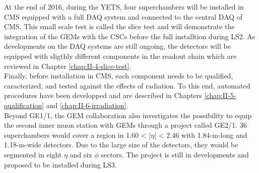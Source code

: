     At the end of 2016, during the YETS, four superchambers will be installed in CMS equipped with a full DAQ system and connected to the central DAQ of CMS. This small scale test is called the slice test and will demonstrate the integration of the GEMs with the CSCs before the full installtion during LS2. As developments on the DAQ systems are still ongoing, the detectors will be equipped with sligthly different components in the readout chain which are reviewed in Chapter \ref{chap:II-4-slice-test}. \\

    Finally, before installation in CMS, each component needs to be qualified, caracterized, and tested against the effects of radiation. To this end, automated procedures have been developped and are described in Chapters \ref{chap:II-5-qualification} and \ref{chap:II-6-irradiation}. \\

    Beyond GE1/1, the GEM collaboration also investigates the possibility to equip the second inner muon station with GEMs through a project called GE2/1. 36 superchambers would cover a region in 1.60 < |$\eta$| < 2.46 with 1.84-m-long and 1.18-m-wide detectors. Due to the large size of the detectors, they would be segmented in eight $ \eta $ and six $ \phi $ sectors. The project is still in developments and proposed to be installed during LS3.
